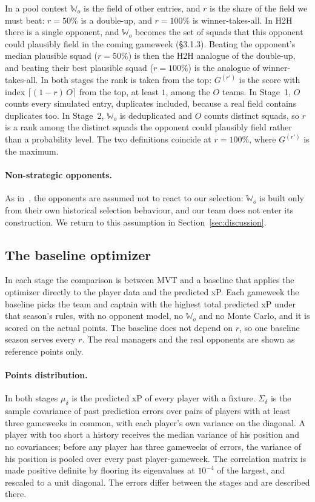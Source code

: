 In a pool contest $\mathbb{W}_o$ is the field of other entries, and $r$ is the share of the
field we must beat: $r=50\%$ is a double-up, and $r=100\%$ is winner-takes-all. In H2H there is
a single opponent, and $\mathbb{W}_o$ becomes the set of squads that this opponent could
plausibly field in the coming gameweek (§3.1.3). Beating the opponent's median plausible squad
($r=50\%$) is then the H2H analogue of the double-up, and beating their best plausible squad
($r=100\%$) is the analogue of winner-takes-all. In both stages the rank is taken from the top:
$G^{(r')}$ is the score with index $\lceil (1-r)\,O\rceil$ from the top, at least $1$, among the
$O$ teams. In Stage~1, $O$ counts every simulated entry, duplicates included, because a real
field contains duplicates too. In Stage~2, $\mathbb{W}_o$ is deduplicated and $O$ counts
distinct squads, so $r$ is a rank among the distinct squads the opponent could plausibly field
rather than a probability level. The two definitions coincide at $r=100\%$, where $G^{(r')}$ is
the maximum.

\paragraph{Non-strategic opponents.} As in~\cite{haugh2021}, the opponents are assumed not to
react to our selection: $\mathbb{W}_o$ is built only from their own historical selection
behaviour, and our team does not enter its construction. We return to this assumption in
Section~\ref{sec:discussion}.

\subsection{The baseline optimizer}
\label{sec:design-baseline}

In each stage the comparison is between MVT and a baseline that applies the optimizer directly
to the player data and the predicted xP. Each gameweek the baseline picks the team and captain
with the highest total predicted xP under that season's rules, with no opponent model, no
$\mathbb{W}_o$ and no Monte Carlo, and it is scored on the actual points. The baseline does not
depend on $r$, so one baseline season serves every $r$. The real managers and the real opponents
are shown as reference points only.

\paragraph{Points distribution.} In both stages $\mu_\delta$ is the predicted xP of every player
with a fixture. $\Sigma_\delta$ is the sample covariance of past prediction errors over pairs of
players with at least three gameweeks in common, with each player's own variance on the
diagonal. A player with too short a history receives the median variance of his position and no
covariances; before any player has three gameweeks of errors, the variance of his position is
pooled over every past player-gameweek. The correlation matrix is made positive definite by
flooring its eigenvalues at $10^{-4}$ of the largest, and rescaled to a unit diagonal. The
errors differ between the stages and are described there.

